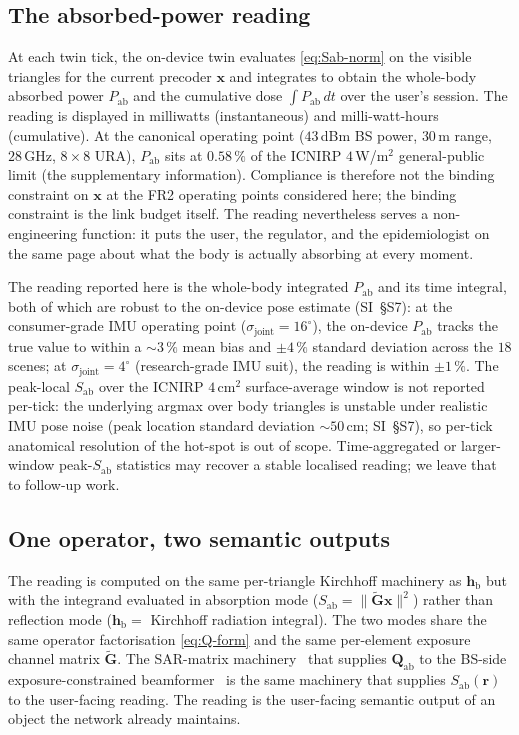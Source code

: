 \documentclass[journal,twocolumn,10pt]{IEEEtran}
\theoremstyle{plain}
\theoremstyle{definition}
\theoremstyle{remark}
\newcommand{\rr}{\mathbf{r}}
\newcommand{\xx}{\mathbf{x}}
\newcommand{\Sab}{S_{\mathrm{ab}}}
\newcommand{\Pabs}{P_{\mathrm{ab}}}
\newcommand{\Qabs}{\mathbf{Q}_{\mathrm{ab}}}
\newcommand{\hbody}{\bm{h}_{\mathrm{b}}}
\begin{document}
\subsection{The absorbed-power reading}

At each twin tick, the on-device twin evaluates \cref{eq:Sab-norm}
on the visible triangles for the current precoder $\xx$ and
integrates to obtain the whole-body absorbed power $\Pabs$ and
the cumulative dose $\int \Pabs\,dt$ over the user's session.
The reading is displayed in milliwatts (instantaneous) and
milli-watt-hours (cumulative). At the canonical operating point
($43\,$dBm BS power, $30\,$m range, $28\,$GHz, $8\times 8$ URA),
$\Pabs$ sits at $0.58\,\%$ of the ICNIRP $4\,$W/m$^{2}$
general-public limit (the supplementary information).
Compliance is therefore not the binding constraint on $\xx$ at
the FR2 operating points considered here; the binding constraint
is the link budget itself. The reading nevertheless serves a
non-engineering function: it puts the user, the regulator, and
the epidemiologist on the same page about what the body is
actually absorbing at every moment.

The reading reported here is the whole-body integrated $\Pabs$
and its time integral, both of which are robust to the on-device
pose estimate (SI~\S{}S7): at the consumer-grade IMU operating
point ($\sigma_\mathrm{joint} = 16^{\circ}$), the on-device
$\Pabs$ tracks the true value to within a ${\sim}3\,\%$ mean bias
and ${\pm}4\,\%$ standard deviation across the $18$ scenes; at
$\sigma_\mathrm{joint} = 4^{\circ}$ (research-grade IMU suit),
the reading is within ${\pm}1\,\%$. The peak-local $\Sab$ over
the ICNIRP $4\,$cm$^{2}$ surface-average window is not reported
per-tick: the underlying argmax over body triangles is unstable
under realistic IMU pose noise (peak location standard deviation
$\sim\!50\,$cm; SI~\S{}S7), so per-tick anatomical resolution of
the hot-spot is out of scope. Time-aggregated or larger-window
peak-$\Sab$ statistics may recover a stable localised reading;
we leave that to follow-up work.

\subsection{One operator, two semantic outputs}

The reading is computed on the same per-triangle Kirchhoff machinery
as $\hbody$ but with the integrand evaluated in absorption mode
($\Sab = \|\tilde{\bm{G}}\xx\|^{2}$) rather than reflection mode
($\hbody = $ Kirchhoff radiation integral). The two modes share the
same operator factorisation \cref{eq:Q-form} and the same per-element
exposure channel matrix $\tilde{\bm{G}}$. The SAR-matrix
machinery~\cite{Hochwald2014,Ying2015,Ying2017} that supplies
$\Qabs$ to the BS-side exposure-constrained
beamformer~\cite{Hochwald2014,Ying2015} is the same machinery that supplies
$\Sab(\rr)$ to the user-facing reading. The reading is the
user-facing semantic output of an object the network already
maintains.
\end{document}
